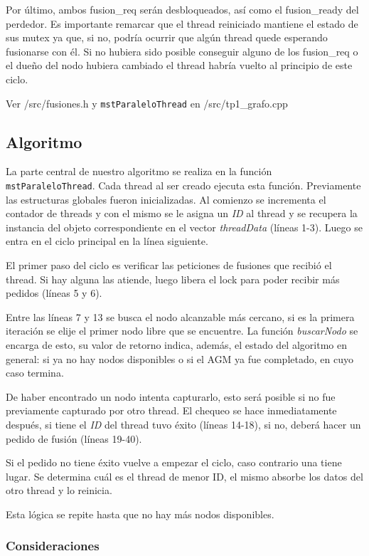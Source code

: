 Por último, ambos fusion\_req serán desbloqueados, así como el fusion\_ready del perdedor. Es importante remarcar que el thread reiniciado mantiene el estado de sus mutex ya que, si no, podría ocurrir que algún thread quede esperando fusionarse con él. Si no hubiera sido posible conseguir alguno de los fusion\_req o el dueño del nodo hubiera cambiado el thread habría vuelto al principio de este ciclo.

Ver \textmd{/src/fusiones.h} y \texttt{mstParaleloThread} en \textmd{/src/tp1_grafo.cpp}

\subsection{Algoritmo}

La parte central de nuestro algoritmo se realiza en la función 
\texttt{mstParaleloThread}. Cada thread al ser creado ejecuta esta función. 
Previamente las estructuras globales fueron inicializadas. Al comienzo se 
incrementa el contador de threads y con el mismo se le asigna un \textit{ID} 
al thread y se recupera la instancia del objeto correspondiente en el vector 
\textit{threadData} (líneas 1-3). Luego se entra en el ciclo principal en la 
línea siguiente.

El primer paso del ciclo es verificar las peticiones de fusiones que recibió el 
thread. Si hay alguna las atiende, luego libera el lock para poder recibir más 
pedidos (líneas 5 y 6).

Entre las líneas 7 y 13 se busca el nodo alcanzable más cercano, si es la 
primera iteración se elije el primer nodo libre que se encuentre. La función 
\textit{buscarNodo} se encarga de esto, su valor de retorno indica, además, 
el estado del algoritmo en general: si ya no hay nodos disponibles o si el AGM 
ya fue completado, en cuyo caso termina.

De haber encontrado un nodo intenta capturarlo, esto será posible si no fue 
previamente capturado por otro thread. El chequeo se hace inmediatamente 
después, si tiene el \textit{ID} del thread tuvo éxito (líneas 14-18), si no, 
deberá hacer un pedido de fusión (líneas 19-40).

Si el pedido no tiene éxito vuelve a empezar el ciclo, caso contrario una 
tiene lugar. Se determina cuál es el thread de menor ID, el mismo absorbe 
los datos del otro thread y lo reinicia.

Esta lógica se repite hasta que no hay más nodos disponibles.

\subsubsection{Consideraciones}

